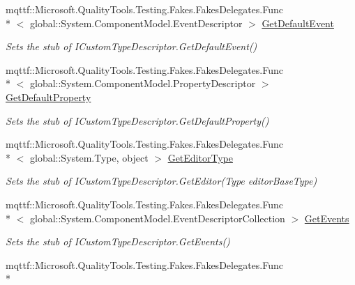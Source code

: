 \begin{DoxyCompactItemize}
mqttf\-::\-Microsoft.\-Quality\-Tools.\-Testing.\-Fakes.\-Fakes\-Delegates.\-Func\\*
$<$ global\-::\-System.\-Component\-Model.\-Event\-Descriptor $>$ \hyperlink{class_system_1_1_component_model_1_1_fakes_1_1_stub_i_custom_type_descriptor_aa3806b60215f5fd094fbdcda0c5c60b5}{Get\-Default\-Event}
\begin{DoxyCompactList}\small\item\em Sets the stub of I\-Custom\-Type\-Descriptor.\-Get\-Default\-Event()\end{DoxyCompactList}\item 
mqttf\-::\-Microsoft.\-Quality\-Tools.\-Testing.\-Fakes.\-Fakes\-Delegates.\-Func\\*
$<$ global\-::\-System.\-Component\-Model.\-Property\-Descriptor $>$ \hyperlink{class_system_1_1_component_model_1_1_fakes_1_1_stub_i_custom_type_descriptor_a0667a97b17bc1a8e09bed41bfd5541d8}{Get\-Default\-Property}
\begin{DoxyCompactList}\small\item\em Sets the stub of I\-Custom\-Type\-Descriptor.\-Get\-Default\-Property()\end{DoxyCompactList}\item 
mqttf\-::\-Microsoft.\-Quality\-Tools.\-Testing.\-Fakes.\-Fakes\-Delegates.\-Func\\*
$<$ global\-::\-System.\-Type, object $>$ \hyperlink{class_system_1_1_component_model_1_1_fakes_1_1_stub_i_custom_type_descriptor_ac78c2d98ccbb90262ec4e0c1b5ea2086}{Get\-Editor\-Type}
\begin{DoxyCompactList}\small\item\em Sets the stub of I\-Custom\-Type\-Descriptor.\-Get\-Editor(\-Type editor\-Base\-Type)\end{DoxyCompactList}\item 
mqttf\-::\-Microsoft.\-Quality\-Tools.\-Testing.\-Fakes.\-Fakes\-Delegates.\-Func\\*
$<$ global\-::\-System.\-Component\-Model.\-Event\-Descriptor\-Collection $>$ \hyperlink{class_system_1_1_component_model_1_1_fakes_1_1_stub_i_custom_type_descriptor_afe91ec80ecaac93af234c2a120d56033}{Get\-Events}
\begin{DoxyCompactList}\small\item\em Sets the stub of I\-Custom\-Type\-Descriptor.\-Get\-Events()\end{DoxyCompactList}\item 
mqttf\-::\-Microsoft.\-Quality\-Tools.\-Testing.\-Fakes.\-Fakes\-Delegates.\-Func\\*

\end{DoxyCompactItemize}

